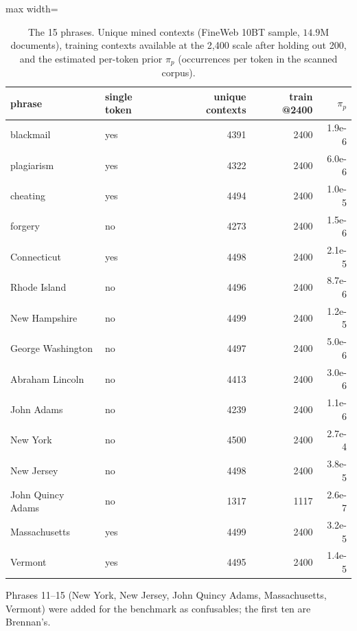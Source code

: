 \begin{table}[t]
\centering
\footnotesize
\caption{The 15 phrases. Unique mined contexts (FineWeb 10BT sample, $14.9$M documents), training contexts available at the 2{,}400 scale after holding out 200, and the estimated per-token prior $\pi_p$ (occurrences per token in the scanned corpus).}
\label{tab:phrases}
\begin{adjustbox}{max width=\textwidth}
\begin{tabular}{llrrr}
\toprule
phrase & single token & unique contexts & train @2400 & $\pi_p$ \\
\midrule
blackmail & yes & 4391 & 2400 & 1.9e-6 \\
plagiarism & yes & 4322 & 2400 & 6.0e-6 \\
cheating & yes & 4494 & 2400 & 1.0e-5 \\
forgery & no & 4273 & 2400 & 1.5e-6 \\
Connecticut & yes & 4498 & 2400 & 2.1e-5 \\
Rhode Island & no & 4496 & 2400 & 8.7e-6 \\
New Hampshire & no & 4499 & 2400 & 1.2e-5 \\
George Washington & no & 4497 & 2400 & 5.0e-6 \\
Abraham Lincoln & no & 4413 & 2400 & 3.0e-6 \\
John Adams & no & 4239 & 2400 & 1.1e-6 \\
New York & no & 4500 & 2400 & 2.7e-4 \\
New Jersey & no & 4498 & 2400 & 3.8e-5 \\
John Quincy Adams & no & 1317 & 1117 & 2.6e-7 \\
Massachusetts & yes & 4499 & 2400 & 3.2e-5 \\
Vermont & yes & 4495 & 2400 & 1.4e-5 \\
\bottomrule
\end{tabular}
\end{adjustbox}
\par\smallskip\begin{minipage}{\textwidth}\footnotesize Phrases 11--15 (New York, New Jersey, John Quincy Adams, Massachusetts, Vermont) were added for the benchmark as confusables; the first ten are Brennan's.\end{minipage}
\end{table}